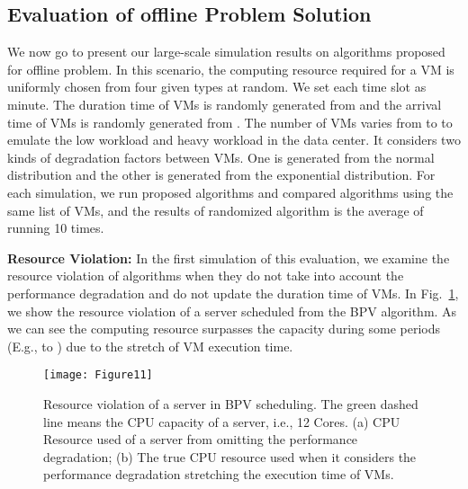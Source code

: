 \documentclass[10pt,journal]{IEEEtran}
\begin{document}
\subsection{Evaluation of offline Problem Solution}
We now go to present our large-scale simulation results on algorithms proposed for offline problem. In this scenario, the computing resource required for a VM is uniformly chosen from four given types at random. We set each time slot as  minute. The duration time of VMs is randomly generated from  and the arrival time of VMs is randomly generated from . The number of VMs varies from  to  to emulate the low workload and heavy workload in the data center. It considers two kinds of degradation factors between VMs. One is generated from the normal distribution and the other is generated from the exponential distribution. For each simulation, we run proposed algorithms and compared algorithms using the same list of VMs, and the results of randomized algorithm is the average of running 10 times.


\textbf{Resource Violation:} In the first simulation of this evaluation, we examine the resource violation of algorithms when they do not take into account the performance degradation and do not update the duration time of VMs. In Fig.~\ref{fig:eva_resource_violation}, we show the resource violation of a server scheduled from the BPV algorithm. As we can see the computing resource surpasses the capacity during some periods (E.g.,  to ) due to the stretch of VM execution time.
\begin{figure}[htbp]
\centering
\texttt{[image: Figure11]}
\centering
\caption{\label{fig:eva_resource_violation}Resource violation of a server in BPV scheduling. The green dashed line means the CPU capacity of a server, i.e., 12 Cores. (a) CPU Resource used of a server from omitting the performance degradation; (b) The true CPU resource used when it considers the performance degradation stretching the execution time of VMs.}
\end{figure}
\end{document}
